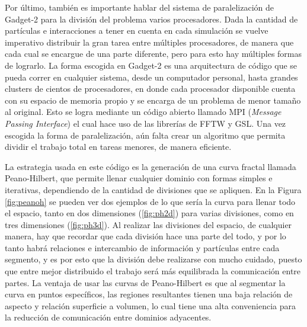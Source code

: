 Por último, también es importante hablar del sistema de paralelización de Gadget-2 para la división del problema varios procesadores. Dada la cantidad de partículas e interacciones a tener en cuenta en cada simulación se vuelve imperativo distribuir la gran tarea entre múltiples procesadores, de manera que cada cual se encargue de una parte diferente, pero para esto hay múltiples formas de lograrlo. La forma escogida en Gadget-2 es una arquitectura de código que se pueda correr en cualquier sistema, desde un computador personal, hasta grandes clusters de cientos de procesadores, en donde cada procesador disponible cuenta con su espacio de memoria propio y se encarga de un problema de menor tamaño al original. Esto se logra mediante un código abierto llamado MPI (\textit{Message Passing Interface}) el cual hace uso de las librerías de FFTW y GSL. Una vez escogida la forma de paralelización, aún falta crear un algoritmo que permita dividir el trabajo total en tareas menores, de manera eficiente.

La estrategia usada en este código es la generación de una curva fractal llamada Peano-Hilbert, que permite llenar cualquier dominio con formas simples e iterativas, dependiendo de la cantidad de divisiones que se apliquen. En la Figura \ref{fig:peanoh} se pueden ver dos ejemplos de lo que sería la curva para llenar todo el espacio, tanto en dos dimensiones (\ref{fig:ph2d}) para varias divisiones, como en tres dimensiones (\ref{fig:ph3d}). Al realizar las divisiones del espacio, de cualquier manera, hay que recordar que cada división hace una parte del todo, y por lo tanto habrá relaciones e intercambio de información y partículas entre cada segmento, y es por esto que la división debe realizarse con mucho cuidado, puesto que entre mejor distribuido el trabajo será más equilibrada la comunicación entre partes. La ventaja de usar las curvas de Peano-Hilbert es que al segmentar la curva en puntos específicos, las regiones resultantes tienen una baja relación de aspecto y relación superficie a volumen, lo cual tiene una alta conveniencia para la reducción de comunicación entre dominios adyacentes. 


